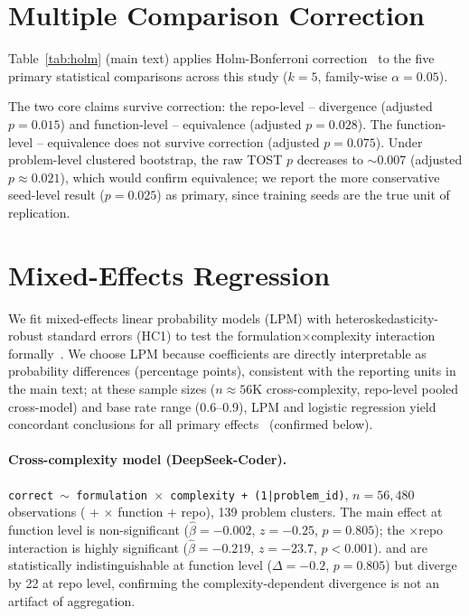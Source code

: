 \section{Multiple Comparison Correction}
\label{app:holm}

Table~\ref{tab:holm} (main text) applies Holm-Bonferroni correction~\cite{holm1979} to the five primary statistical comparisons across this study ($k{=}5$, family-wise $\alpha{=}0.05$).

The two core claims survive correction: the repo-level \cls{}--\cwm{} divergence (adjusted $p{=}0.015$) and function-level \cls{}--\cwm{} equivalence (adjusted $p{=}0.028$). The function-level \cls{}--\traj{} equivalence does not survive correction (adjusted $p{=}0.075$). Under problem-level clustered bootstrap, the raw TOST $p$ decreases to ${\sim}$0.007 (adjusted $p{\approx}0.021$), which would confirm equivalence; we report the more conservative seed-level result ($p{=}0.025$) as primary, since training seeds are the true unit of replication.

\section{Mixed-Effects Regression}
\label{app:interaction}

We fit mixed-effects linear probability models (LPM) with heteroskedasticity-robust standard errors (HC1) to test the formulation$\times$complexity interaction formally~\cite{moulton1990}. We choose LPM because coefficients are directly interpretable as probability differences (percentage points), consistent with the reporting units in the main text; at these sample sizes ($n{\approx}56$K cross-complexity, repo-level pooled cross-model) and base rate range (0.6--0.9), LPM and logistic regression yield concordant conclusions for all primary effects~\cite{angrist2009mostly} (confirmed below).

\paragraph{Cross-complexity model (DeepSeek-Coder).} \texttt{correct $\sim$ formulation $\times$ complexity + (1|problem\_id)}, $n{=}56{,}480$ observations (\cls{} + \cwm{} $\times$ function + repo), 139 problem clusters. The \cwm{} main effect at function level is non-significant ($\hat{\beta}{=}-0.002$, $z{=}-0.25$, $p{=}0.805$); the \cwm{}$\times$repo interaction is highly significant ($\hat{\beta}{=}-0.219$, $z{=}-23.7$, $p{<}0.001$). \cwm{} and \cls{} are statistically indistinguishable at function level ($\Delta{=}-0.2$\pp{}, $p{=}0.805$) but diverge by 22\pp{} at repo level, confirming the complexity-dependent divergence is not an artifact of aggregation.

